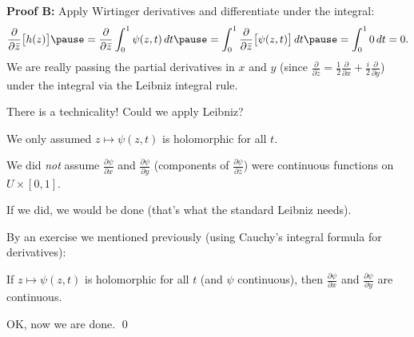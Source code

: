 \documentclass[10pt,aspectratio=169]{beamer}
\begin{document}
\begin{frame}

\textbf{Proof B:}
Apply Wirtinger derivatives and differentiate under the integral:
\pause
\[
\frac{\partial}{\partial \bar{z}}
\bigl[
h(z)
\bigr]
\pause
=
\frac{\partial}{\partial \bar{z}}
\int_0^1 \psi(z,t) \, dt
\pause
=
\int_0^1
\frac{\partial}{\partial \bar{z}}
\bigl[
\psi(z,t)
\bigr]
\, dt
\pause
= \int_0^1 0 \, dt = 0.
\]
\pause
We are really passing the partial derivatives in $x$
and $y$ (since $\frac{\partial}{\partial \bar{z}} = \frac{1}{2}
\frac{\partial}{\partial x} + \frac{i}{2} \frac{\partial}{\partial y}$)
under the integral via the Leibniz integral rule.

\medskip
\pause

There is a technicality!  Could we apply Leibniz?

\medskip
\pause

We only assumed $z \mapsto \psi(z,t)$ is holomorphic for all $t$.

\pause
\medskip

We did \emph{not} assume
$\frac{\partial \psi}{\partial x}$ and $\frac{\partial \psi}{\partial y}$
(components of 
$\frac{\partial \psi}{\partial \bar{z}}$)
were continuous functions on $U \times [0,1]$.

If we did, we would be done (that's what the standard Leibniz needs).

\medskip
\pause

By an exercise we mentioned previously
(using Cauchy's integral formula for derivatives):

If
$z \mapsto \psi(z,t)$ is holomorphic for all $t$ (and $\psi$ continuous),
then
$\frac{\partial \psi}{\partial x}$ and $\frac{\partial \psi}{\partial y}$
are continuous.

\medskip
\pause

OK, now we are done.
\qed

\end{frame}
\end{document}
